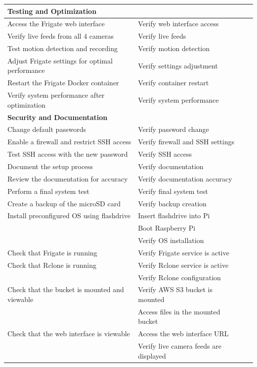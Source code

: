 \documentclass{report}
\begin{document}
\begin{longtable}{|p{3cm}|p{3cm}|p{3cm}|p{3cm}|}
\hline
\textbf{Testing and Optimization} &  &  &  \\
\hline
Access the Frigate web interface & Verify web interface access &  &  \\
\hline
Verify live feeds from all 4 cameras & Verify live feeds &  &  \\
\hline
Test motion detection and recording & Verify motion detection &  &  \\
\hline
Adjust Frigate settings for optimal performance & Verify settings adjustment &  &  \\
\hline
Restart the Frigate Docker container & Verify container restart &  &  \\
\hline
Verify system performance after optimization & Verify system performance &  &  \\
\hline
\textbf{Security and Documentation} &  &  &  \\
\hline
Change default passwords & Verify password change &  &  \\
\hline
Enable a firewall and restrict SSH access & Verify firewall and SSH settings &  &  \\
\hline
Test SSH access with the new password & Verify SSH access &  &  \\
\hline
Document the setup process & Verify documentation &  &  \\
\hline
Review the documentation for accuracy & Verify documentation accuracy &  &  \\
\hline
Perform a final system test & Verify final system test &  &  \\
\hline
Create a backup of the microSD card & Verify backup creation &  &  \\
\hline
Install preconfigured OS using flashdrive & Insert flashdrive into Pi &  &  \\
\hline
 & Boot Raspberry Pi &  &  \\
\hline
 & Verify OS installation &  &  \\
\hline
Check that Frigate is running & Verify Frigate service is active &  &  \\
\hline
Check that Rclone is running & Verify Rclone service is active &  &  \\
\hline
 & Verify Rclone configuration &  &  \\
\hline
Check that the bucket is mounted and viewable & Verify AWS S3 bucket is mounted &  &  \\
\hline
 & Access files in the mounted bucket &  &  \\
\hline
Check that the web interface is viewable & Access the web interface URL &  &  \\
\hline
 & Verify live camera feeds are displayed &  &  \\
\hline
\end{longtable}
\end{document}
